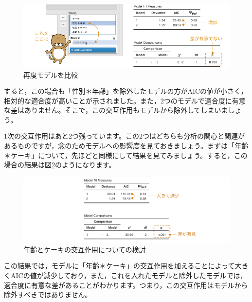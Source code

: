 \documentclass[
  12pt,
  a5jpaper,
  lualatex, ja=standard]{bxjsbook}
\begin{document}
\begin{figure}[!ht]

{\centering \includegraphics[width=1\linewidth]{images/frequencies/loglin-modelbuilder-compare2} 

}

\caption{再度モデルを比較}\label{fig:frequencies-loglin-modelbuilder-compare2}
\end{figure}

すると，この場合も「性別＊年齢」を除外したモデルの方がAICの値が小さく，相対的な適合度が高いことが示されました。また，2つのモデルで適合度に有意な差はありません。そこで，この交互作用もモデルから除外してしまいましょう。

1次の交互作用はあと2つ残っています。この2つはどちらも分析の関心と関連があるものですが，念のためモデルへの影響度を見ておきましょう。まずは「年齢＊ケーキ」について，先ほどと同様にして結果を見てみましょう。すると，この場合の結果は図\ref{fig:frequencies-loglin-modelbuilder-comparison3}のようになります。

\begin{figure}[!ht]

{\centering \includegraphics[width=1\linewidth]{images/frequencies/loglin-modelbuilder-comparison3} 

}

\caption{年齢とケーキの交互作用についての検討}\label{fig:frequencies-loglin-modelbuilder-comparison3}
\end{figure}

この結果では，モデルに「年齢＊ケーキ」の交互作用を加えることによって大きくAICの値が減少しており，また，これを入れたモデルと除外したモデルでは，適合度に有意な差があることがわかります。つまり，この交互作用はモデルから除外すべきではありません。
\end{document}

